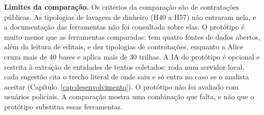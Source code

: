 \textbf{Limites da comparação.} Os critérios da comparação são de
contratações públicas. As tipologias de lavagem de dinheiro (H40 a H57) não
entraram nela, e a documentação das ferramentas não foi consultada sobre
elas. O protótipo é muito menor que as ferramentas
comparadas: tem quatro fontes de dados abertos, além da leitura de editais, e dez tipologias de contratações, enquanto a Alice cruza mais
de 40 bases e aplica mais de 30 trilhas. A IA do protótipo é opcional e
restrita à extração de entidades de textos coletados: roda num servidor
local, cada sugestão cita o trecho literal de onde saiu e só entra no caso se
o analista aceitar (Capítulo~\ref{cap:desenvolvimento}). O protótipo não foi
avaliado com usuários policiais. A comparação mostra uma combinação que falta, e não que o
protótipo substitua essas ferramentas.

